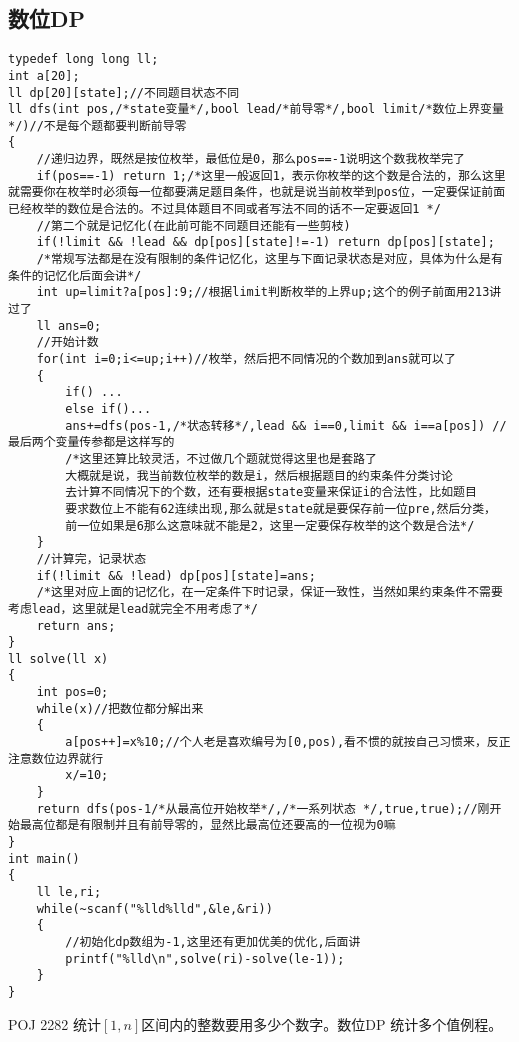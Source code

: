 \documentclass[UTF8]{ctexart}
\begin{document}
\subsection{数位DP}
\begin{lstlisting}
typedef long long ll;
int a[20];
ll dp[20][state];//不同题目状态不同
ll dfs(int pos,/*state变量*/,bool lead/*前导零*/,bool limit/*数位上界变量*/)//不是每个题都要判断前导零
{
    //递归边界，既然是按位枚举，最低位是0，那么pos==-1说明这个数我枚举完了
    if(pos==-1) return 1;/*这里一般返回1，表示你枚举的这个数是合法的，那么这里就需要你在枚举时必须每一位都要满足题目条件，也就是说当前枚举到pos位，一定要保证前面已经枚举的数位是合法的。不过具体题目不同或者写法不同的话不一定要返回1 */
    //第二个就是记忆化(在此前可能不同题目还能有一些剪枝)
    if(!limit && !lead && dp[pos][state]!=-1) return dp[pos][state];
    /*常规写法都是在没有限制的条件记忆化，这里与下面记录状态是对应，具体为什么是有条件的记忆化后面会讲*/
    int up=limit?a[pos]:9;//根据limit判断枚举的上界up;这个的例子前面用213讲过了
    ll ans=0;
    //开始计数
    for(int i=0;i<=up;i++)//枚举，然后把不同情况的个数加到ans就可以了
    {
        if() ...
        else if()...
        ans+=dfs(pos-1,/*状态转移*/,lead && i==0,limit && i==a[pos]) //最后两个变量传参都是这样写的
        /*这里还算比较灵活，不过做几个题就觉得这里也是套路了
        大概就是说，我当前数位枚举的数是i，然后根据题目的约束条件分类讨论
        去计算不同情况下的个数，还有要根据state变量来保证i的合法性，比如题目
        要求数位上不能有62连续出现,那么就是state就是要保存前一位pre,然后分类，
        前一位如果是6那么这意味就不能是2，这里一定要保存枚举的这个数是合法*/
    }
    //计算完，记录状态
    if(!limit && !lead) dp[pos][state]=ans;
    /*这里对应上面的记忆化，在一定条件下时记录，保证一致性，当然如果约束条件不需要考虑lead，这里就是lead就完全不用考虑了*/
    return ans;
}
ll solve(ll x)
{
    int pos=0;
    while(x)//把数位都分解出来
    {
        a[pos++]=x%10;//个人老是喜欢编号为[0,pos),看不惯的就按自己习惯来，反正注意数位边界就行
        x/=10;
    }
    return dfs(pos-1/*从最高位开始枚举*/,/*一系列状态 */,true,true);//刚开始最高位都是有限制并且有前导零的，显然比最高位还要高的一位视为0嘛
}
int main()
{
    ll le,ri;
    while(~scanf("%lld%lld",&le,&ri))
    {
        //初始化dp数组为-1,这里还有更加优美的优化,后面讲
        printf("%lld\n",solve(ri)-solve(le-1));
    }
}  
\end{lstlisting}
POJ 2282 统计$[1,n]$区间内的整数要用多少个数字。数位DP 统计多个值例程。
\end{document}
